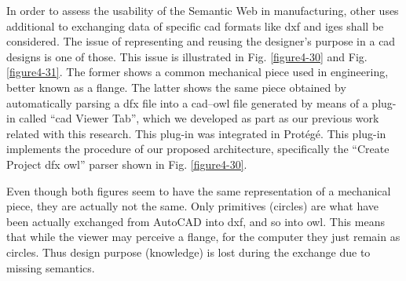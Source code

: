 In order to assess the usability of the Semantic Web in manufacturing, other uses additional to exchanging data of specific \gls{cad} formats like \gls{dxf} and \gls{iges} shall be considered. The issue of representing and reusing the designer’s purpose in a \gls{cad} designs is one of those. This issue is illustrated in Fig. \ref{figure4-30} and Fig. \ref{figure4-31}. The former shows a common mechanical piece used in engineering, better known as a flange. The latter shows the same piece obtained by automatically parsing a \gls{dfx} file into a \gls{cad}–\gls{owl} file generated by means of a plug-in called “\gls{cad} Viewer Tab”, which we developed as part as our previous work related with this research. This plug-in was integrated in Protégé. This plug-in implements the procedure   of our proposed architecture, specifically the “Create Project \gls{dfx}  \gls{owl}” parser shown in Fig. \ref{figure4-30}.

Even though both figures seem to have the same representation of a mechanical piece, they are actually not the same. Only primitives (circles) are what have been actually exchanged from AutoCAD into \gls{dxf}, and so into \gls{owl}. This means that while the viewer may perceive a flange, for the computer they just remain as circles. Thus design purpose (knowledge) is lost during the exchange due to missing semantics.


